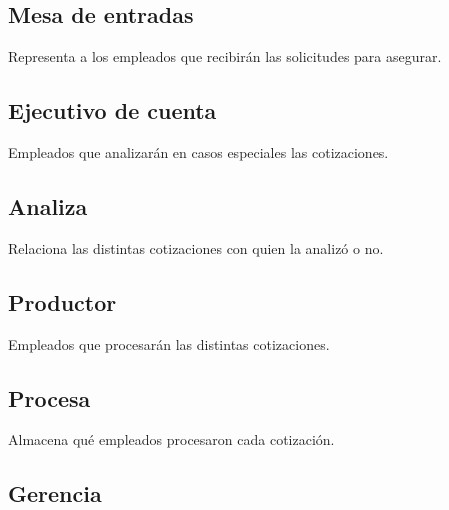 \documentclass[a4paper,11pt]{article}
\begin{document}


   
  
  

\subsection{Mesa de entradas}

Representa a los empleados que recibirán las solicitudes para asegurar.

\subsection{Ejecutivo de cuenta}

Empleados que analizarán en casos especiales las cotizaciones.

\subsection{Analiza}

Relaciona las distintas cotizaciones con quien la analizó o no.

\subsection{Productor}

Empleados que procesarán las distintas cotizaciones.

\subsection{Procesa}

Almacena qué empleados procesaron cada cotización.

\subsection{Gerencia}
\end{document}
